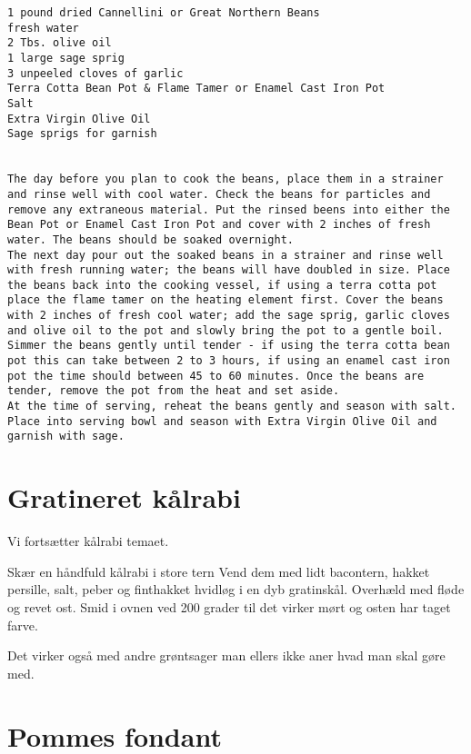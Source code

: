 \documentclass[
  letterpaper,
  DIV=11,
  numbers=noendperiod]{scrreprt}
\begin{document}
\begin{verbatim}
1 pound dried Cannellini or Great Northern Beans
fresh water
2 Tbs. olive oil
1 large sage sprig
3 unpeeled cloves of garlic
Terra Cotta Bean Pot & Flame Tamer or Enamel Cast Iron Pot
Salt
Extra Virgin Olive Oil
Sage sprigs for garnish


The day before you plan to cook the beans, place them in a strainer and rinse well with cool water. Check the beans for particles and remove any extraneous material. Put the rinsed beens into either the Bean Pot or Enamel Cast Iron Pot and cover with 2 inches of fresh water. The beans should be soaked overnight.
The next day pour out the soaked beans in a strainer and rinse well with fresh running water; the beans will have doubled in size. Place the beans back into the cooking vessel, if using a terra cotta pot place the flame tamer on the heating element first. Cover the beans with 2 inches of fresh cool water; add the sage sprig, garlic cloves and olive oil to the pot and slowly bring the pot to a gentle boil. Simmer the beans gently until tender - if using the terra cotta bean pot this can take between 2 to 3 hours, if using an enamel cast iron pot the time should between 45 to 60 minutes. Once the beans are tender, remove the pot from the heat and set aside.
At the time of serving, reheat the beans gently and season with salt. Place into serving bowl and season with Extra Virgin Olive Oil and garnish with sage.
\end{verbatim}

\hypertarget{gratineret-kuxe5lrabi}{%
\section{Gratineret kålrabi}\label{gratineret-kuxe5lrabi}}

Vi fortsætter kålrabi temaet.

Skær en håndfuld kålrabi i store tern Vend dem med lidt bacontern,
hakket persille, salt, peber og finthakket hvidløg i en dyb gratinskål.
Overhæld med fløde og revet ost. Smid i ovnen ved 200 grader til det
virker mørt og osten har taget farve.

Det virker også med andre grøntsager man ellers ikke aner hvad man skal
gøre med.

\hypertarget{pommes-fondant}{%
\section{Pommes fondant}\label{pommes-fondant}}
\end{document}
